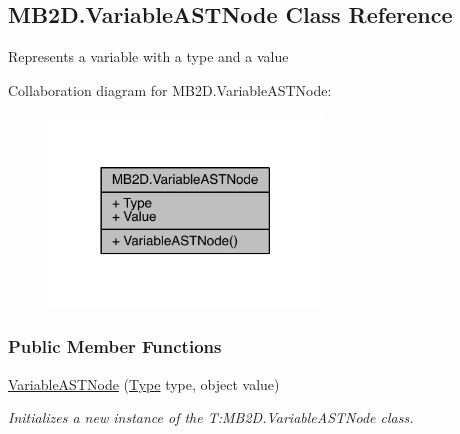 \hypertarget{class_m_b2_d_1_1_variable_a_s_t_node}{}\subsection{M\+B2\+D.\+Variable\+A\+S\+T\+Node Class Reference}
\label{class_m_b2_d_1_1_variable_a_s_t_node}


Represents a variable with a type and a value  




Collaboration diagram for M\+B2\+D.\+Variable\+A\+S\+T\+Node\+:
\nopagebreak
\begin{figure}[H]
\begin{center}
\leavevmode
\includegraphics[width=206pt]{class_m_b2_d_1_1_variable_a_s_t_node__coll__graph}
\end{center}
\end{figure}
\subsubsection*{Public Member Functions}
\begin{DoxyCompactItemize}
\item 
\hyperlink{class_m_b2_d_1_1_variable_a_s_t_node_a60c81f23a47577aefc76ecb9dc18d40f}{Variable\+A\+S\+T\+Node} (\hyperlink{class_m_b2_d_1_1_variable_a_s_t_node_a32549a5361b7664b945b4d9537a5b454}{Type} type, object value)
\begin{DoxyCompactList}\small\item\em Initializes a new instance of the T\+:\+M\+B2\+D.\+Variable\+A\+S\+T\+Node class. \end{DoxyCompactList}\end{DoxyCompactItemize}
